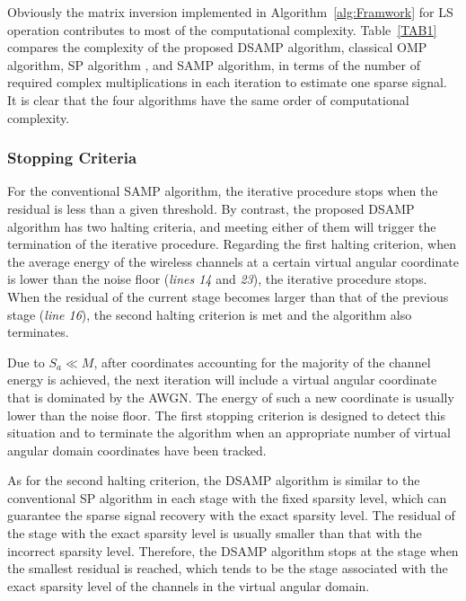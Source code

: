 \documentclass[final]{IEEEtran}
\begin{document}
 Obviously the matrix inversion implemented in Algorithm~\ref{alg:Framwork} for LS
 operation contributes to most of the computational complexity. Table~\ref{TAB1} compares
 the complexity of the proposed DSAMP algorithm, classical OMP algorithm, SP algorithm
 \cite{STR_CS}, and SAMP algorithm, in terms of the number of required complex
 multiplications in each iteration to estimate one sparse signal. It is clear that the four
 algorithms have the same order of computational complexity.

\subsubsection{Stopping Criteria}\label{convergence}

 For the conventional SAMP algorithm, the iterative procedure stops when the residual
 is less than a given threshold. By contrast, the proposed DSAMP algorithm has two
 halting criteria, and meeting either of them will trigger the termination of the
 iterative procedure. Regarding the first halting criterion, when the average energy of
 the wireless channels at a certain virtual angular coordinate is lower than the noise
 floor (\emph{lines 14} and \emph{23}), the iterative procedure stops. When the residual
 of the current stage becomes larger than that of the previous stage (\emph{line 16}),
 the second halting criterion is met and the algorithm also terminates.

 Due to $S_a \ll M$, after coordinates accounting for the majority of the channel energy
 is achieved, the next iteration will include a virtual angular coordinate that is
 dominated by the AWGN. The energy of such a new coordinate is usually lower than the
 noise floor. The first stopping criterion is designed to detect this situation and to
 terminate the algorithm when an appropriate number of virtual angular domain coordinates
 have been tracked.

 As for the second halting criterion, the DSAMP algorithm is similar to the conventional
 SP algorithm in each stage with the fixed sparsity level, which can guarantee the sparse
 signal recovery with the exact sparsity level. The residual of the stage with the exact
 sparsity level is usually smaller than that with the incorrect sparsity level. Therefore,
 the DSAMP algorithm stops at the stage when the smallest residual is reached, which tends
 to be the stage associated with the exact sparsity level of the channels in the virtual
 angular domain.

\end{document}
